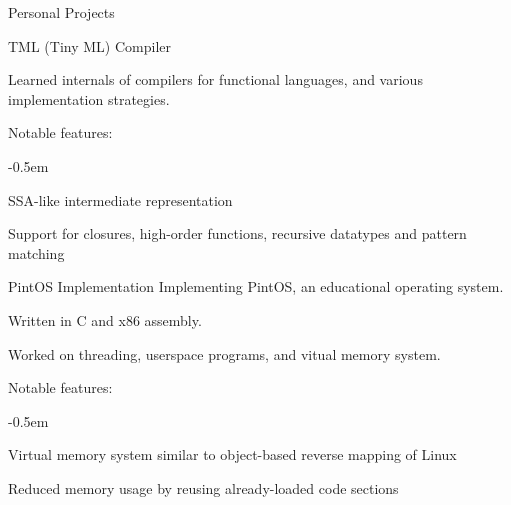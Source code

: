 \documentclass{resume}
\begin{document}
\begin{res-section}{Personal Projects}
\begin{res-subsection}{TML (Tiny ML) Compiler}{}
    \item Learned internals of compilers for functional languages, and various implementation strategies.

    \item Notable features:
    \vspace{-0.5em}
    \begin{list}{--}{}
      \itemsep -0.5em
      \item SSA-like intermediate representation
      \item Support for closures, high-order functions, recursive datatypes and pattern matching
    \end{list}
  \end{res-subsection}

  \begin{res-subsection}{PintOS Implementation}{}
    Implementing PintOS, an educational operating system.

    \item Written in C and x86 assembly.

    \item Worked on threading, userspace programs, and vitual memory system.

    \item Notable features:
    \vspace{-0.5em}
    \begin{list}{--}{}
      \itemsep -0.5em
      \item Virtual memory system similar to object-based reverse mapping of Linux
      \item Reduced memory usage by reusing already-loaded code sections
    \end{list}
  \end{res-subsection}
\end{res-section}
\end{document}
